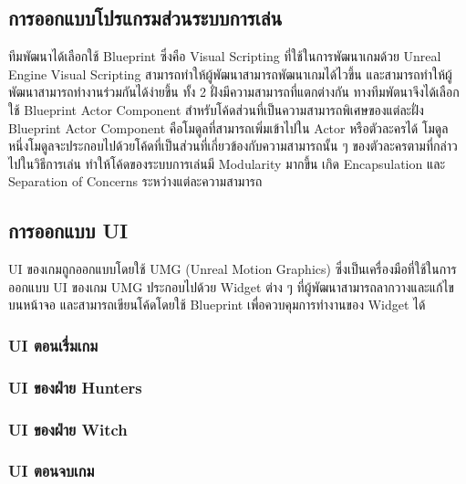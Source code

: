 \subsection{การออกแบบโปรแกรมส่วนระบบการเล่น}

ทีมพัฒนาได้เลือกใช้ Blueprint ซึ่งคือ Visual Scripting ที่ใช้ในการพัฒนาเกมด้วย Unreal Engine 
Visual Scripting สามารถทำให้ผู้พัฒนาสามารถพัฒนาเกมได้ไวขึ้น และสามารถทำให้ผู้พัฒนาสามารถทำงานร่วมกันได้ง่ายขึ้น
ทั้ง 2 ฝั่งมีความสามารถที่แตกต่างกัน ทางทีมพัตนาจึงได้เลือกใช้ Blueprint Actor Component สำหรับโค้ดส่วนที่เป็นความสามารถพิเศษของแต่ละฝั่ง
Blueprint Actor Component คือโมดูลที่สามารถเพิ่มเข้าไปใน Actor หรือตัวละครได้ โมดูลหนึ่งโมดูลจะประกอบไปด้วยโค้ดที่เป็นส่วนที่เกี่ยวข้องกับความสามารถนั้น ๆ
ของตัวละครตามที่กล่าวไปในวิธีการเล่น ทำให้โค้ดของระบบการเล่นมี Modularity มากขึ้น เกิด Encapsulation และ Separation of Concerns ระหว่างแต่ละความสามารถ

\subsection{การออกแบบ UI}

UI ของเกมถูกออกแบบโดยใช้ UMG (Unreal Motion Graphics) ซึ่งเป็นเครื่องมือที่ใช้ในการออกแบบ UI ของเกม
UMG ประกอบไปด้วย Widget ต่าง ๆ ที่ผู้พัฒนาสามารถลากวางและแก้ไขบนหน้าจอ และสามารถเขียนโค้ดโดยใช้ Blueprint
เพื่อควบคุมการทำงานของ Widget ได้

\subsubsection{UI ตอนเรื่มเกม}

\subsubsection{UI ของฝ่าย Hunters}

\subsubsection{UI ของฝ่าย Witch}

\subsubsection{UI ตอนจบเกม}